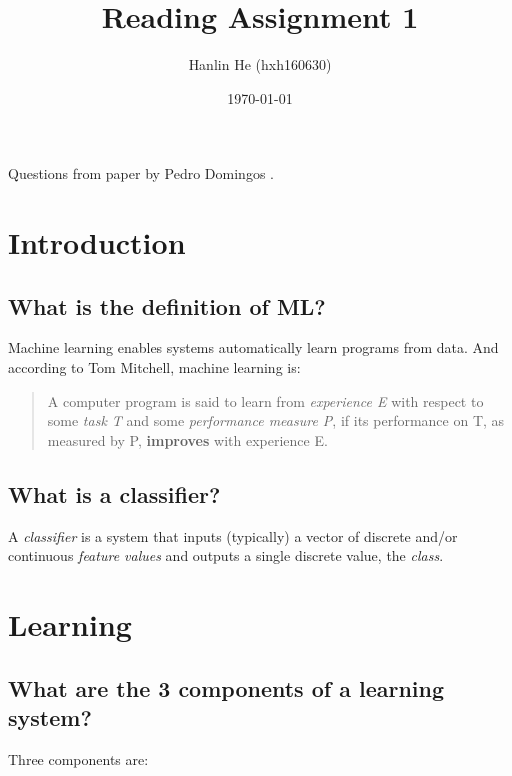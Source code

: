 \documentclass[10pt]{article}
\title{Reading Assignment 1}
\author{Hanlin He (hxh160630)}
\date{\today}
\begin{document}
\maketitle

Questions from paper by Pedro Domingos
\cite{Domingos:2012:FUT:2347736.2347755}.

\section{Introduction}

\subsection{What is the definition of ML?}

Machine learning enables systems automatically learn programs from data.
And according to Tom Mitchell, machine learning is:

\begin{quote}
    A computer program is said to learn from \emph{experience E} with respect
    to some \emph{task T} and some \emph{performance measure P}, if its
    performance on T, as measured by P, \textbf{improves} with experience E.
\end{quote}

\subsection{What is a classifier?}

A \emph{classifier} is a system that inputs (typically) a vector of discrete
and/or continuous \emph{feature values} and outputs a single discrete value,
the \emph{class}.

\section{Learning}

\subsection{What are the 3 components of a learning system?}

Three components are:
\end{document}
